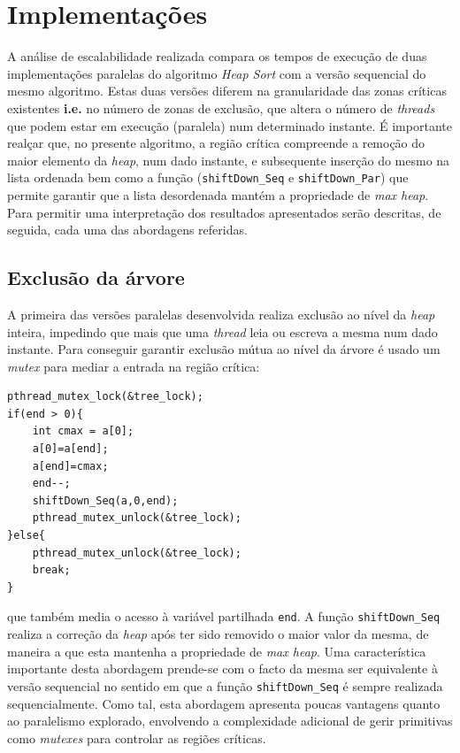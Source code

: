 \documentclass{article}
\begin{document}
\section{Implementações}
A análise de escalabilidade realizada compara os tempos de execução de duas implementações paralelas do algoritmo \textit{Heap Sort} com a versão
sequencial do mesmo algoritmo. Estas duas versões diferem na granularidade das zonas críticas existentes \textbf{i.e.} no número de zonas de 
exclusão, que altera o número de \textit{threads} que podem estar em execução (paralela) num determinado instante. É importante realçar que, no
presente algoritmo, a região crítica compreende a remoção do maior elemento da \textit{heap}, num dado instante, e subsequente inserção do mesmo
na lista ordenada bem como a função (\texttt{shiftDown\_Seq} e \texttt{shiftDown\_Par}) que permite garantir que a lista desordenada mantém a propriedade 
de \textit{max heap}.
Para permitir uma interpretação dos resultados apresentados serão descritas, de seguida, cada uma das abordagens referidas.

\subsection{Exclusão da árvore}
A primeira das versões paralelas desenvolvida realiza exclusão ao nível da \textit{heap} inteira, impedindo que mais que uma \textit{thread} leia ou 
escreva a mesma num dado instante. Para conseguir garantir exclusão mútua ao nível da árvore é usado um \textit{mutex} para 
mediar a entrada na região crítica:

\footnotesize
\begin{verbatim}
pthread_mutex_lock(&tree_lock); 
if(end > 0){
    int cmax = a[0];
    a[0]=a[end];
    a[end]=cmax;
    end--;
    shiftDown_Seq(a,0,end);
    pthread_mutex_unlock(&tree_lock);
}else{
    pthread_mutex_unlock(&tree_lock);
    break;
}
\end{verbatim}
\normalsize
que também media o acesso à variável partilhada \texttt{end}. A função \texttt{shiftDown\_Seq} realiza a correção da \textit{heap} após 
ter sido removido o maior valor da mesma, de maneira a que esta mantenha a propriedade de \textit{max heap}. Uma característica importante 
desta abordagem prende-se com o facto da mesma ser equivalente à versão sequencial no sentido em que a função \texttt{shiftDown\_Seq} é sempre 
realizada sequencialmente. Como tal, esta abordagem apresenta poucas vantagens quanto ao paralelismo explorado, envolvendo a complexidade 
adicional de gerir primitivas como \textit{mutexes} para controlar as regiões críticas.
\end{document}
